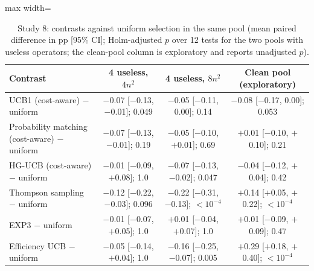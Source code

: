 \begin{table}[t]
\caption{Study 8: contrasts against uniform selection in the same pool (mean paired difference in pp [95\% CI]; Holm-adjusted $p$ over 12 tests for the two pools with useless operators; the clean-pool column is exploratory and reports unadjusted $p$).}\label{tab:s8tests}
\centering
\small
\begin{adjustbox}{max width=\linewidth}
\begin{tabular}{lccc}
\toprule
Contrast & 4 useless, $4n^2$ & 4 useless, $8n^2$ & Clean pool (exploratory) \\
\midrule
UCB1 (cost-aware) $-$ uniform & $-$0.07 [$-$0.13, $-$0.01]; 0.049 & $-$0.05 [$-$0.11, 0.00]; 0.14 & $-$0.08 [$-$0.17, 0.00]; 0.053 \\
Probability matching (cost-aware) $-$ uniform & $-$0.07 [$-$0.13, $-$0.01]; 0.19 & $-$0.05 [$-$0.10, $+$0.01]; 0.69 & $+$0.01 [$-$0.10, $+$0.10]; 0.21 \\
HG-UCB (cost-aware) $-$ uniform & $-$0.01 [$-$0.09, $+$0.08]; 1.0 & $-$0.07 [$-$0.13, $-$0.02]; 0.047 & $-$0.04 [$-$0.12, $+$0.04]; 0.42 \\
Thompson sampling $-$ uniform & $-$0.12 [$-$0.22, $-$0.03]; 0.096 & $-$0.22 [$-$0.31, $-$0.13]; \ensuremath{<10^{-4}} & $+$0.14 [$+$0.05, $+$0.22]; \ensuremath{<10^{-4}} \\
EXP3 $-$ uniform & $-$0.01 [$-$0.07, $+$0.05]; 1.0 & $+$0.01 [$-$0.04, $+$0.07]; 1.0 & $+$0.01 [$-$0.09, $+$0.09]; 0.47 \\
Efficiency UCB $-$ uniform & $-$0.05 [$-$0.14, $+$0.04]; 1.0 & $-$0.16 [$-$0.25, $-$0.07]; 0.005 & $+$0.29 [$+$0.18, $+$0.40]; \ensuremath{<10^{-4}} \\
\bottomrule
\end{tabular}
\end{adjustbox}
\end{table}
